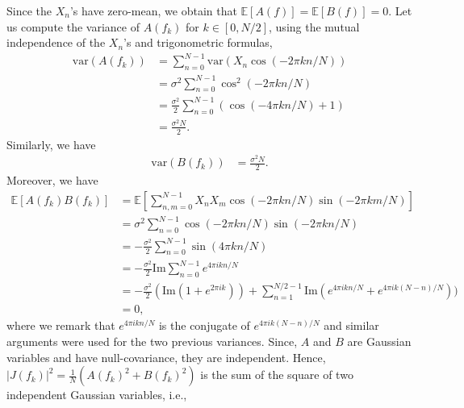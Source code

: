 \documentclass[11pt]{article}
\begin{document}
\begin{solution}
    Since the $X_n$'s have zero-mean, we obtain that $\mathbb{E}[A(f)] = \mathbb{E}[B(f)] = 0$. Let us compute the variance of $A(f_k)$ for $k\in [0, N/2]$, using the mutual independence of the $X_n$'s and trigonometric formulas,
    \begin{equation}
        \begin{split}
            \text{var}(A(f_k)) &= \sum_{n=0}^{N-1}\text{var}(X_n \cos(-2\pi k n / N))\\
            &=\sigma^2\sum_{n=0}^{N-1}\cos^2(-2\pi k n/N )\\
            &=\frac{\sigma^2}{2}\sum_{n=0}^{N-1}(\cos(-4\pi k n / N)+1)\\
            &=\frac{\sigma^2N}{2}.
        \end{split}
    \end{equation}
    Similarly, we have
    \begin{equation}
        \begin{split}
            \text{var}(B(f_k)) &= \frac{\sigma^2N}{2}.
        \end{split}
    \end{equation}
    Moreover, we have
    \begin{equation}
        \begin{split}
            \mathbb{E}[A(f_k)B(f_k)] &= \mathbb{E}[\sum_{n,m=0}^{N-1}X_nX_m\cos(-2\pi k n / N)\sin(-2\pi k m / N)]\\ &= \sigma^2\sum_{n=0}^{N-1}\cos(-2\pi k n / N)\sin(-2\pi k n / N)\\
            &= -\frac{\sigma^2}{2}\sum_{n=0}^{N-1}\sin(4\pi k n / N)\\
            &= -\frac{\sigma^2}{2}\text{Im}\sum_{n=0}^{N-1}e^{4\pi i k n /N}\\
            &= -\frac{\sigma^2}{2}(\text{Im}(1 + e^{2\pi i k}))+\sum_{n=1}^{N/2-1}\text{Im}(e^{4\pi i k n / N}+e^{4\pi i k (N-n)/N}))\\
            &= 0,
        \end{split}
    \end{equation}
    where we remark that $e^{4\pi i k n / N}$ is the conjugate of $e^{4\pi i k (N-n)/N}$ and similar arguments were used for the two previous variances.
    Since, $A$ and $B$ are Gaussian variables and have null-covariance, they are independent.
    Hence, $|J(f_k)|^2 = \frac{1}{N}(A(f_k)^2 + B(f_k)^2)$ is the sum of the square of two independent Gaussian variables, i.e.,
    \begin{equation}

\end{equation}
\end{solution}
\end{document}
